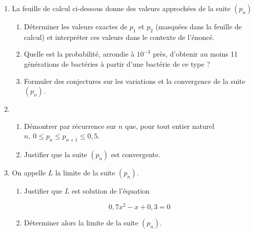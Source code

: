 \documentclass[11pt]{article}
\begin{document}
\begin{minipage}{0.68\linewidth}
\begin{enumerate}
\item La feuille de calcul ci-dessous donne des valeurs approchées de la suite $\left(p_n\right)$
	\begin{enumerate}
		\item Déterminer les valeurs exactes de $p_1$ et $p_2$ (masquées dans la feuille de calcul) et interpréter ces valeurs dans le contexte de l'énoncé.
		\item Quelle est la probabilité, arrondie à $10^{-3}$ près, d'obtenir au moins 11 générations de bactéries à partir d'une bactérie de ce type ?
		\item Formuler des conjectures sur les variations et la convergence de la suite $\left(p_n\right)$.
	\end{enumerate}
\item 
	\begin{enumerate}
		\item Démontrer par récurrence sur $n$ que,
pour tout entier naturel $n,\: 0 \leqslant p_n \leqslant p_{n+1} \leqslant0,5$.
		\item Justifier que la suite $\left(p_n\right)$ est convergente.
	\end{enumerate}
\item On appelle $L$ la limite de la suite $\left(p_n\right)$.
	\begin{enumerate}
		\item Justifier que $L$ est solution de l'équation 
		
		\[0,7x^2 - x  + 0,3 = 0\]
		\item Déterminer alors la limite de la suite $\left(p_n\right)$.
	\end{enumerate}
\end{enumerate}
\end{minipage}\hfill
\end{document}
